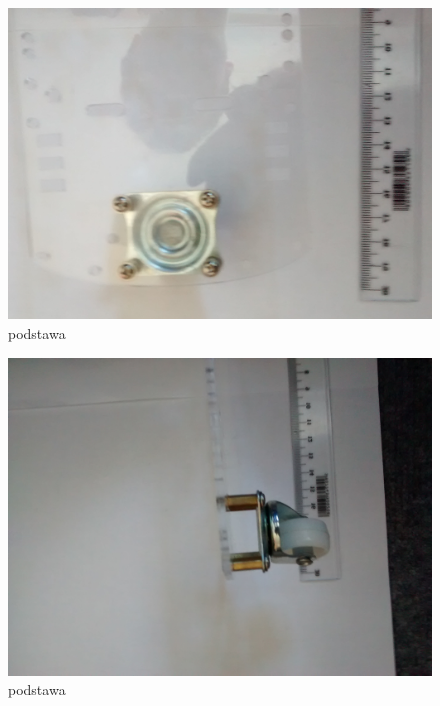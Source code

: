 \documentclass[a4paper,11pt]{article}
\def\SCALE{0.6}
\begin{document}
\begin{figure}[H]
	\centering
	\includegraphics[width=\SCALE
	\paperwidth]{podstawa-3}
	\caption{podstawa}
\end{figure}

\begin{figure}[H]
	\centering
	\includegraphics[width=\SCALE
	\paperwidth]{podstawa-4}
	\caption{podstawa}
\end{figure}
\end{document}
